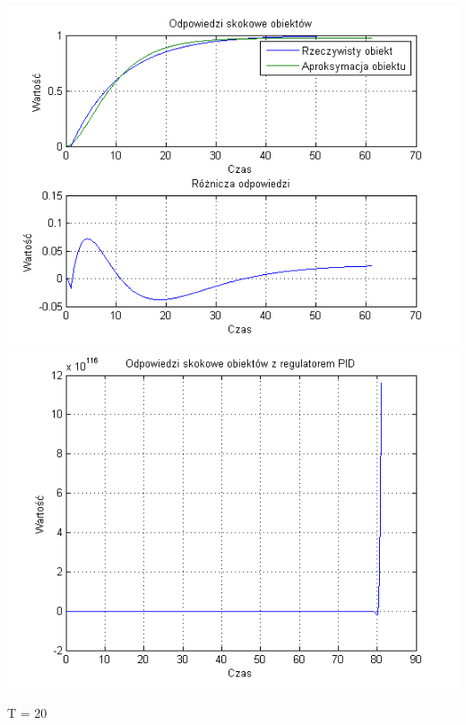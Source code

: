 \documentclass[10pt,a4paper]{article}
\begin{document}
\begin{center}
\includegraphics[scale=1]{images/dwa/skrypt_29.png}\\
\includegraphics[scale=1]{images/dwa/skrypt_30.png}\\
\end{center}
\newpage
T = 20
\end{document}
